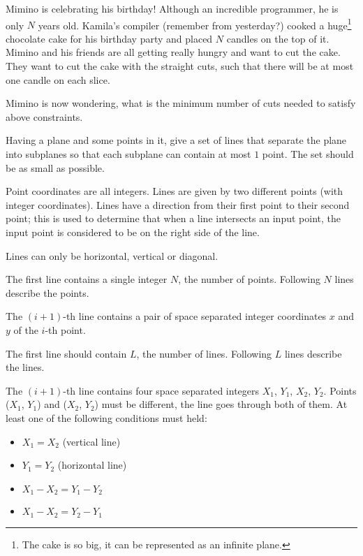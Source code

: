 

Mimino is celebrating his birthday!
Although an incredible programmer, he is only $N$ years old.
Kamila's compiler (remember from yesterday?) cooked a huge\footnote{The cake is so big, it can be represented as an infinite plane.}
chocolate cake for his birthday party and placed $N$ candles on the top of it.
Mimino and his friends are all getting really hungry and want to cut the cake.
They want to cut the cake with the straight cuts, such that there will be at most one candle on each slice.

Mimino is now wondering, what is the minimum number of cuts needed to satisfy above constraints.


Having a plane and some points in it, give a set of lines that separate the plane into subplanes so that each subplane can contain at most $1$ point. The set should be as small as possible.

Point coordinates are all integers. Lines are given by two different points (with integer coordinates). Lines have a direction from their first point to their second point; this is used to determine that when a line intersects an input point, the input point is considered to be on the right side of the line.

Lines can only be horizontal, vertical or diagonal.


The first line contains a single integer $N$, the number of points.
Following $N$ lines describe the points.

The $(i+1)$-th line contains a pair of space separated integer coordinates $x$ and $y$ of the $i$-th point.


The first line should contain $L$, the number of lines.
Following $L$ lines describe the lines.

The $(i+1)$-th line contains four space separated integers $X_1$, $Y_1$, $X_2$, $Y_2$. Points ($X_1$, $Y_1$) and ($X_2$, $Y_2$) must be different, the line goes through both of them. At least one of the following conditions must held:

\begin{itemize}
  \item $X_1 = X_2$ (vertical line)
  \item $Y_1 = Y_2$ (horizontal line)
  \item $X_1 - X_2 = Y_1 - Y_2$
  \item $X_1 - X_2 = Y_2 - Y_1$
\end{itemize}

